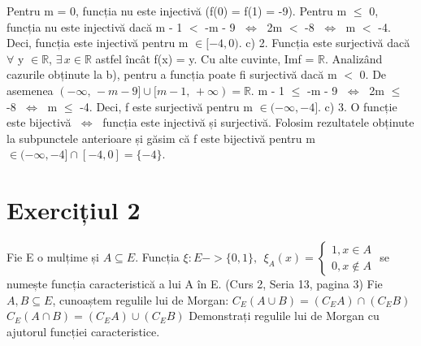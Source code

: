 \documentclass{article}
\DeclareRobustCommand\iff{\;\Longleftrightarrow\;}
\begin{document}
\newline
Pentru m = 0, funcția nu este injectivă (f(0) = f(1) = -9).
\newline
Pentru m $\leq$ 0, funcția nu este injectivă dacă m - 1 $<$ -m - 9 $\iff$ 2m $<$ -8 $\iff$ m $<$ -4. 
\newline
Deci, funcția este injectivă pentru m $\in [-4, 0)$.
\newline
\newline
c) 2. Funcția este surjectivă dacă $\forall$ y $\in \mathbb{R}$, $\exists \, x \in \mathbb{R}$ astfel încât f(x) = y. Cu alte cuvinte, Imf = $\mathbb{R}$. Analizând cazurile obținute la b), pentru a funcția poate fi surjectivă dacă m $<$ 0. De asemenea $(-\infty, \, -m-9] \cup [m-1, \, +\infty) = \mathbb{R}$. 
\newline
m - 1 $\leq$ -m - 9 $\iff$ 2m $\leq$ -8 $\iff$ m $\leq$ -4.
\newline
Deci, f este surjectivă pentru m $\in (-\infty, -4]$. 
\newline
c) 3. O funcție este bijectivă $\iff$ funcția este injectivă și surjectivă. Folosim rezultatele obținute la subpunctele anterioare și găsim că f este bijectivă pentru m $\in (-\infty, -4] \cap [-4, 0] = \{-4\}$.

\section{Exercițiul 2}
Fie E o mulțime și $A \subseteq E$. Funcția $\xi : E -> \{0, 1\}, \ \  \xi_A (x) = 
\begin{cases}
    1, x \in A \\
    0, x \notin A
\end{cases}$ 
\newline
se numește funcția caracteristică a lui A în E. (Curs 2, Seria 13, pagina 3)
\newline
Fie $A, B \subseteq E$, cunoaștem regulile lui de Morgan: 
\newline
$C_E(A\cup B) = (C_E A)\cap (C_E B)$
\newline
$C_E(A\cap B) = (C_E A)\cup (C_E B)$
\newline
Demonstrați regulile lui de Morgan cu ajutorul funcției caracteristice.
\end{document}
